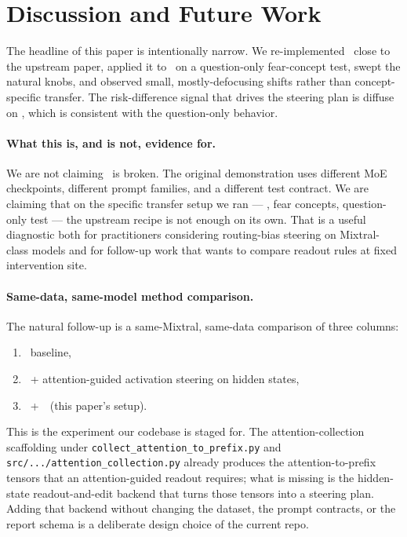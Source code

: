 \section{Discussion and Future Work}
\label{sec:conclusion}

The headline of this paper is intentionally narrow. We re-implemented
\steermoe~close to the upstream paper, applied it to \mixtral~on a
question-only fear-concept test, swept the natural knobs, and observed
small, mostly-defocusing shifts rather than concept-specific transfer.
The risk-difference signal that drives the steering plan is diffuse on
\mixtral, which is consistent with the question-only behavior.

\paragraph{What this is, and is not, evidence for.}
We are not claiming \steermoe~is broken. The original demonstration uses
different MoE checkpoints, different prompt families, and a different
test contract. We are claiming that on the specific transfer setup we
ran --- \mixtral, fear concepts, question-only test --- the upstream
recipe is not enough on its own. That is a useful diagnostic both for
practitioners considering routing-bias steering on Mixtral-class models
and for follow-up work that wants to compare readout rules at fixed
intervention site.

\paragraph{Same-data, same-model method comparison.}
The natural follow-up is a same-Mixtral, same-data comparison of three
columns:

\begin{enumerate}
  \item \mixtral~baseline,
  \item \mixtral~+ attention-guided activation steering on hidden states,
  \item \mixtral~+~\steermoe~(this paper's setup).
\end{enumerate}

This is the experiment our codebase is staged for. The
attention-collection scaffolding under
\texttt{collect\_attention\_to\_prefix.py} and
\texttt{src/.../attention\_collection.py} already produces the
attention-to-prefix tensors that an attention-guided readout requires;
what is missing is the hidden-state readout-and-edit backend that turns
those tensors into a steering plan. Adding that backend without
changing the dataset, the prompt contracts, or the report schema is a
deliberate design choice of the current repo.

